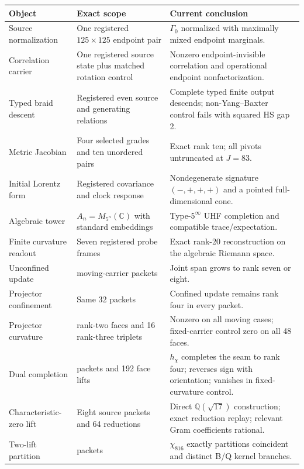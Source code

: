 \documentclass[12pt,a4paper,twoside]{article}
\begin{document}
\begin{longtable}{>{\raggedright\arraybackslash}p{}>{\raggedright\arraybackslash}p{}>{\raggedright\arraybackslash}p{}}
\toprule
Object & Exact scope & Current conclusion \\
\midrule
\endhead
Source normalization & One registered $125\times125$ endpoint pair & $\Gamma_0$ normalized with maximally mixed endpoint marginals. \\
Correlation carrier & One registered source state plus matched rotation control & Nonzero endpoint-invisible correlation and operational endpoint nonfactorization. \\
Typed braid descent & Registered even source and generating relations & Complete typed finite output descends; non-Yang--Baxter control fails with squared HS gap 2. \\
Metric Jacobian & Four selected grades and ten unordered pairs & Exact rank ten; all pivots untruncated at $J=83$. \\
Initial Lorentz form & Registered covariance and clock response & Nondegenerate signature $(-,+,+,+)$ and a pointed full-dimensional cone. \\
Algebraic tower & $A_n=M_{5^n}(\mathbb C)$ with standard embeddings & Type-$5^\infty$ UHF completion and compatible trace/expectation. \\
Finite curvature readout & Seven registered probe frames & Exact rank-20 reconstruction on the algebraic Riemann space. \\
Unconfined update & 32 moving-carrier packets & Joint span grows to rank seven or eight. \\
Projector confinement & Same 32 packets & Confined update remains rank four in every packet. \\
Projector curvature & 48 rank-two faces and 16 rank-three triplets & Nonzero on all moving cases; fixed-carrier control zero on all 48 faces. \\
Dual completion & 64 packets and 192 face lifts & $h_\chi$ completes the seam to rank four; reverses sign with orientation; vanishes in fixed-curvature control. \\
Characteristic-zero lift & Eight source packets and 64 reductions & Direct $\mathbb Q(\sqrt{17})$ construction; exact reduction replay; relevant Gram coefficients rational. \\
Two-lift partition & 64 packets & $\chi_{816}$ exactly partitions coincident and distinct B/Q kernel branches. \\

\end{longtable}
\end{document}
